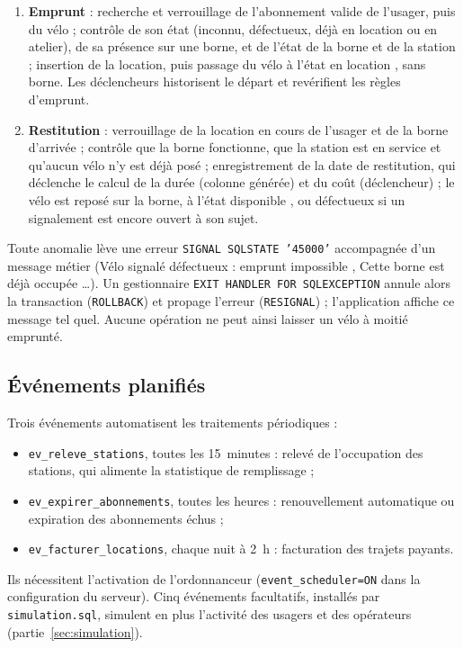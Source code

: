 \begin{enumerate}
	\item \textbf{Emprunt} : recherche et verrouillage de l'abonnement valide de l'usager, puis du vélo ; contrôle de son état (inconnu, défectueux, déjà en location ou en atelier), de sa présence sur une borne, et de l'état de la borne et de la station ; insertion de la location, puis passage du vélo à l'état \og en location \fg{}, sans borne. Les déclencheurs historisent le départ et revérifient les règles d'emprunt.
	\item \textbf{Restitution} : verrouillage de la location en cours de l'usager et de la borne d'arrivée ; contrôle que la borne fonctionne, que la station est en service et qu'aucun vélo n'y est déjà posé ; enregistrement de la date de restitution, qui déclenche le calcul de la durée (colonne générée) et du coût (déclencheur) ; le vélo est reposé sur la borne, à l'état \og disponible \fg{}, ou \og défectueux \fg{} si un signalement est encore ouvert à son sujet.
\end{enumerate}

Toute anomalie lève une erreur \texttt{SIGNAL SQLSTATE '45000'} accompagnée d'un message métier (\og Vélo signalé défectueux : emprunt impossible \fg{}, \og Cette borne est déjà occupée \fg{}\ldots). Un gestionnaire \texttt{EXIT HANDLER FOR SQLEXCEPTION} annule alors la transaction (\texttt{ROLLBACK}) et propage l'erreur (\texttt{RESIGNAL}) ; l'application affiche ce message tel quel. Aucune opération ne peut ainsi laisser un vélo à moitié emprunté.

\subsection{Événements planifiés}

Trois événements automatisent les traitements périodiques :
\begin{itemize}
	\item \texttt{ev\_releve\_stations}, toutes les 15~minutes : relevé de l'occupation des stations, qui alimente la statistique de remplissage ;
	\item \texttt{ev\_expirer\_abonnements}, toutes les heures : renouvellement automatique ou expiration des abonnements échus ;
	\item \texttt{ev\_facturer\_locations}, chaque nuit à 2~h : facturation des trajets payants.
\end{itemize}
Ils nécessitent l'activation de l'ordonnanceur (\texttt{event\_scheduler=ON} dans la configuration du serveur). Cinq événements facultatifs, installés par \texttt{simulation.sql}, simulent en plus l'activité des usagers et des opérateurs (partie~\ref{sec:simulation}).

